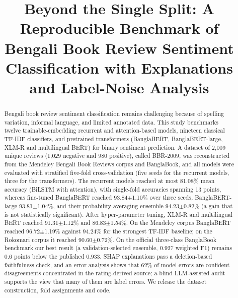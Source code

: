 \documentclass[journal]{IEEEtran}
\newcommand{\pmstd}[2]{#1$\pm$#2}
\begin{document}
\title{Beyond the Single Split: A Reproducible Benchmark of Bengali Book Review Sentiment Classification with Explanations and Label-Noise Analysis}



\maketitle

\begin{abstract}
Bengali book review sentiment classification remains challenging because of spelling variation, informal language, and limited annotated data. This study benchmarks twelve trainable-embedding recurrent and attention-based models, nineteen classical TF-IDF classifiers, and pretrained transformers (BanglaBERT, BanglaBERT-large, XLM-R and multilingual BERT) for binary sentiment prediction. A dataset of 2{,}009 unique reviews (1{,}029 negative and 980 positive), called BBR-2009, was reconstructed from the Mendeley Bengali Book Reviews corpus and BanglaBook, and all models were evaluated with stratified five-fold cross-validation (five seeds for the recurrent models, three for the transformers). The recurrent models reached at most 81.08\% mean accuracy (BiLSTM with attention), with single-fold accuracies spanning 13 points, whereas fine-tuned BanglaBERT reached \pmstd{93.84}{1.10}\% over three seeds, BanglaBERT-large \pmstd{93.81}{1.04}\%, and their probability-averaging ensemble \pmstd{94.23}{0.82}\% (a gain that is not statistically significant). After hyper-parameter tuning, XLM-R and multilingual BERT reached \pmstd{91.31}{1.12}\% and \pmstd{86.83}{1.54}\%. On the Mendeley corpus BanglaBERT reached \pmstd{96.72}{1.19}\% against 94.24\% for the strongest TF-IDF baseline; on the Rokomari corpus it reached \pmstd{90.60}{0.72}\%. On the official three-class BanglaBook benchmark our best result (a validation-selected ensemble, 0.927 weighted F1) remains 0.6 points below the published 0.933. SHAP explanations pass a deletion-based faithfulness check, and an error analysis shows that 62\% of model errors are confident disagreements concentrated in the rating-derived source; a blind LLM-assisted audit supports the view that many of them are label errors. We release the dataset construction, fold assignments and code.
\end{abstract}
\end{document}
